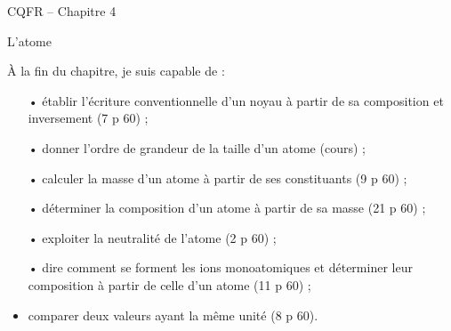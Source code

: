 \documentclass[12pt,a5paper]{article}
\begin{document}
\begin{header}
CQFR -- Chapitre 4

L'atome
\end{header}

À la fin du chapitre, je suis capable de :
\begin{itemize}
\item[•] établir l'écriture conventionnelle d'un noyau à partir de sa composition et inversement (7 p 60) ;
\item[•] donner l'ordre de grandeur de la taille d'un atome (cours) ;
\item[•] calculer la masse d'un atome à partir de ses constituants (9 p 60) ;
\item[•] déterminer la composition d'un atome à partir de sa masse (21 p 60) ;
\item[•] exploiter la neutralité de l'atome (2 p 60) ;
\item[•] dire comment se forment les ions monoatomiques et déterminer leur composition à partir de celle d'un atome (11 p 60) ;
\item comparer deux valeurs ayant la même unité (8 p 60).
\end{itemize}
\end{document}
